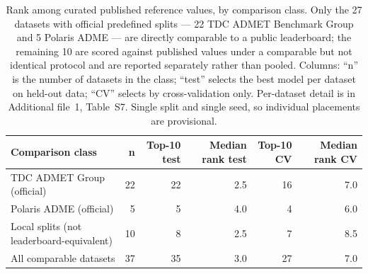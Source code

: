 \begin{table}[htbp]
\centering
\footnotesize
\caption{Rank among curated published reference values, by comparison class. Only the 27 datasets with official predefined splits --- 22 TDC ADMET Benchmark Group and 5 Polaris ADME --- are directly comparable to a public leaderboard; the remaining 10 are scored against published values under a comparable but not identical protocol and are reported separately rather than pooled. Columns: ``n'' is the number of datasets in the class; ``test'' selects the best model per dataset on held-out data; ``CV'' selects by cross-validation only. Per-dataset detail is in Additional file~1, Table~S7. Single split and single seed, so individual placements are provisional.}
\label{tab:leaderboardsummary}
\begin{tabularx}{\textwidth}{@{}>{\raggedright\arraybackslash}Xrrrrr@{}}
\toprule
\textbf{Comparison class} & \textbf{n} & \textbf{Top-10 test} & \textbf{Median rank test} & \textbf{Top-10 CV} & \textbf{Median rank CV} \\
\midrule
TDC ADMET Group (official) & 22 & 22 & 2.5 & 16 & 7.0 \\
Polaris ADME (official) & 5 & 5 & 4.0 & 4 & 6.0 \\
Local splits (not leaderboard-\allowbreak{}equivalent) & 10 & 8 & 2.5 & 7 & 8.5 \\
All comparable datasets & 37 & 35 & 3.0 & 27 & 7.0 \\
\bottomrule
\end{tabularx}
\end{table}
